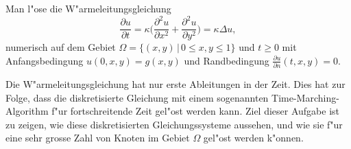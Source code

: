 \begin{aufgabe}
Man l"ose die W"armeleitungsgleichung
\[
\frac{\partial u}{\partial t}
=
\kappa
\biggl(
\frac{\partial^2u}{\partial x^2}
+
\frac{\partial^2u}{\partial y^2}
\biggr)
=
\kappa\Delta u,
\]
numerisch auf dem Gebiet $\Omega=\{(x,y)\,|\,0\le x,y\le 1\}$ und
$t\ge 0$ mit Anfangsbedingung $u(0, x, y)=g(x,y)$ und Randbedingung
$\frac{\partial u}{\partial n}(t,x,y)=0$.
\end{aufgabe}

Die W"armeleitungsgleichung hat nur erste Ableitungen in der Zeit. 
Dies hat zur Folge, dass die diskretisierte Gleichung mit einem
sogenannten Time-Marching-Algorithm f"ur fortschreitende Zeit
gel"ost werden kann.
Ziel dieser Aufgabe ist zu zeigen, wie diese
diskretisierten Gleichungssysteme aussehen, und wie sie f"ur eine sehr
grosse Zahl von Knoten im Gebiet $\Omega$ gel"ost werden k"onnen.



